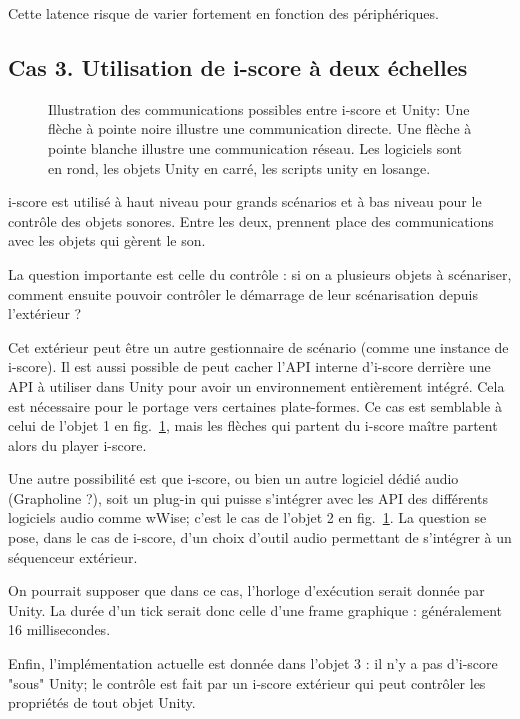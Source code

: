 \documentclass[french,12pt,a4paper]{article}
\begin{document}
Cette latence risque de varier fortement en fonction des périphériques. 

\subsection{Cas 3. Utilisation de i-score à deux échelles}
\begin{figure}
    \centering
    \scalebox{0.5}{}
    \caption{Illustration des communications possibles entre i-score et Unity:
        Une flèche à pointe noire illustre une communication directe. Une flèche à pointe blanche illustre une communication réseau. Les logiciels sont en rond, les objets Unity en carré, les scripts unity en losange.}
    \label{fig.com.iscore.unity}
\end{figure}

i-score est utilisé à haut niveau pour grands scénarios et à bas niveau pour le contrôle des objets sonores.
Entre les deux, prennent place des communications avec les objets qui gèrent le son.

La question importante est celle du contrôle : si on a plusieurs objets à scénariser, comment 
ensuite pouvoir contrôler le démarrage de leur scénarisation depuis l'extérieur ? 

Cet extérieur peut être un autre gestionnaire de scénario (comme une instance de i-score).
Il est aussi possible de peut cacher l'API interne d'i-score derrière une API à utiliser dans Unity pour avoir un environnement entièrement intégré. 
Cela est nécessaire pour le portage vers certaines plate-formes. 
Ce cas est semblable à celui de l'objet 1 en fig.~\ref{fig.com.iscore.unity}, mais les flèches qui partent du i-score maître partent alors du player i-score.

Une autre possibilité est que i-score, ou bien un autre logiciel dédié audio (Grapholine ?), soit un plug-in qui puisse s'intégrer avec les API des différents logiciels audio comme wWise; c'est le cas de l'objet 2 en fig.~\ref{fig.com.iscore.unity}.
La question se pose, dans le cas de i-score, d'un choix d'outil audio permettant de s'intégrer à un séquenceur extérieur.

On pourrait supposer que dans ce cas, l'horloge d'exécution serait donnée par Unity. 
La durée d'un tick serait donc celle d'une frame graphique : généralement 16 millisecondes.

Enfin, l'implémentation actuelle est donnée dans l'objet 3 : il n'y a pas d'i-score "sous" Unity; le contrôle est fait par un i-score extérieur qui peut contrôler les propriétés de tout objet Unity. 
\end{document}
